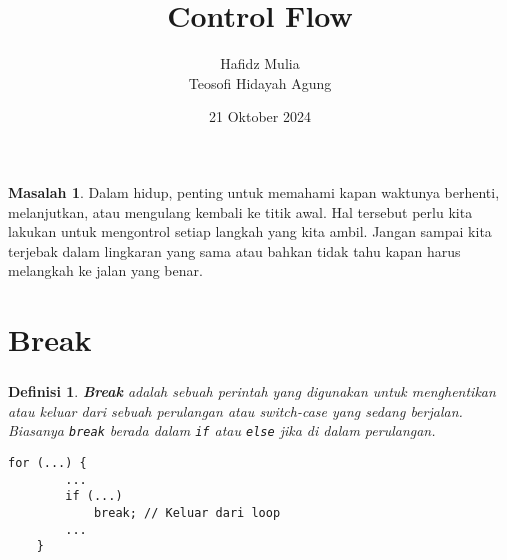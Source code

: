 \documentclass[aspectratio=169]{beamer}
\author[Tew \& Haf]{Hafidz Mulia\\Teosofi Hidayah Agung}
\date{21 Oktober 2024}
\title[Alpro 1 - Week 6]{Control Flow}
\institute[Matematika ITS]{Departemen Matematika\\ Institut Teknologi Sepuluh Nopember}
\newtheorem*{definisi}{Definisi}
\theoremstyle{definition}
\newtheorem*{masalah}{Masalah}
\begin{document}
    {
    \begin{frame}
        \titlepage
    \end{frame}
    }


    \begin{frame}
        \begin{masalah}
            Dalam hidup, penting untuk memahami kapan waktunya berhenti, melanjutkan, atau mengulang kembali ke titik awal. Hal tersebut perlu kita lakukan untuk mengontrol setiap langkah yang kita ambil. Jangan sampai kita terjebak dalam lingkaran yang sama atau bahkan tidak tahu kapan harus melangkah ke jalan yang benar.
        \end{masalah}
    \end{frame}

    \section{Break}
    \begin{frame}[fragile]
        \frametitle{\insertsection}
        \begin{definisi}
            \textbf{Break} adalah sebuah perintah yang digunakan untuk menghentikan atau keluar dari sebuah perulangan atau \textit{switch-case} yang sedang berjalan. Biasanya \texttt{break} berada dalam \texttt{if} atau \texttt{else} jika di dalam perulangan.
        \end{definisi}
        \begin{lstlisting}[style=standard,firstnumber=34,caption={Contoh penggunaan \texttt{break} dalam \texttt{for}}]
    for (...) {
        ...
        if (...)
            break; // Keluar dari loop
        ...
    }
        \end{lstlisting}
    \end{frame}
\end{document}
